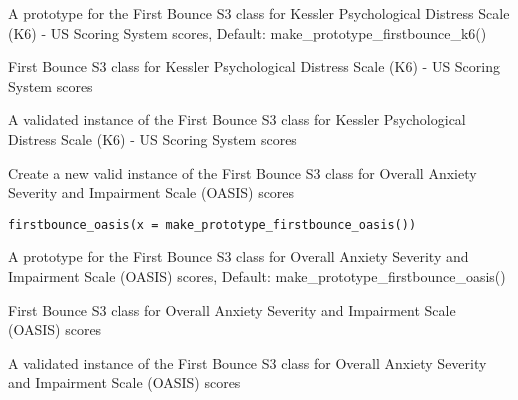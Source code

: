 \documentclass[a4paper]{book}
\begin{document}
%
\begin{Arguments}
\begin{ldescription}
\item[\code{x}] A prototype for the First Bounce S3 class for Kessler Psychological Distress Scale (K6) - US Scoring System scores, Default: make\_prototype\_firstbounce\_k6()
\end{ldescription}
\end{Arguments}
%
\begin{Details}\relax
First Bounce S3 class for Kessler Psychological Distress Scale (K6) - US Scoring System scores
\end{Details}
%
\begin{Value}
A validated instance of the First Bounce S3 class for Kessler Psychological Distress Scale (K6) - US Scoring System scores
\end{Value}
%
\begin{Description}\relax
Create a new valid instance of the First Bounce S3 class for Overall Anxiety Severity and Impairment Scale (OASIS) scores
\end{Description}
%
\begin{Usage}
\begin{verbatim}
firstbounce_oasis(x = make_prototype_firstbounce_oasis())
\end{verbatim}
\end{Usage}
%
\begin{Arguments}
\begin{ldescription}
\item[\code{x}] A prototype for the First Bounce S3 class for Overall Anxiety Severity and Impairment Scale (OASIS) scores, Default: make\_prototype\_firstbounce\_oasis()
\end{ldescription}
\end{Arguments}
%
\begin{Details}\relax
First Bounce S3 class for Overall Anxiety Severity and Impairment Scale (OASIS) scores
\end{Details}
%
\begin{Value}
A validated instance of the First Bounce S3 class for Overall Anxiety Severity and Impairment Scale (OASIS) scores
\end{Value}
\end{document}
